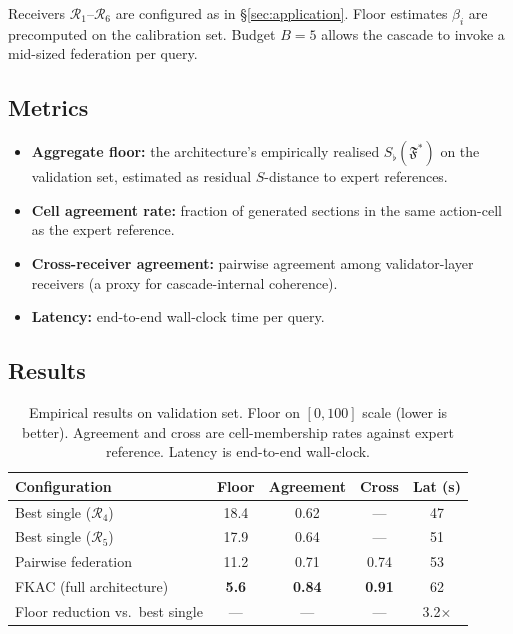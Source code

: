 \documentclass[11pt,twocolumn,a4paper]{article}
\theoremstyle{definition}
\theoremstyle{remark}
\newcommand{\Federation}{\mathfrak{F}}
\newcommand{\receiver}{\mathcal{R}}
\newcommand{\Sscalar}{S}
\newcommand{\Sfloor}{S_{\flat}}
\begin{document}
Receivers $\receiver_1$--$\receiver_6$ are configured as in \S\ref{sec:application}. Floor estimates $\beta_i$ are precomputed on the calibration set. Budget $B = 5$ allows the cascade to invoke a mid-sized federation per query.

\subsection{Metrics}

\begin{itemize}[leftmargin=*,nosep]
\item \textbf{Aggregate floor:} the architecture's empirically realised $\Sfloor(\Federation^*)$ on the validation set, estimated as residual $\Sscalar$-distance to expert references.
\item \textbf{Cell agreement rate:} fraction of generated sections in the same action-cell as the expert reference.
\item \textbf{Cross-receiver agreement:} pairwise agreement among validator-layer receivers (a proxy for cascade-internal coherence).
\item \textbf{Latency:} end-to-end wall-clock time per query.
\end{itemize}

\subsection{Results}

\begin{table}[t]
\centering\small
\begin{tabular}{lcccc}
\toprule
Configuration & Floor & Agreement & Cross & Lat (s) \\
\midrule
Best single ($\receiver_4$) & 18.4 & 0.62 & --- & 47 \\
Best single ($\receiver_5$) & 17.9 & 0.64 & --- & 51 \\
Pairwise federation & 11.2 & 0.71 & 0.74 & 53 \\
FKAC (full architecture)& \textbf{5.6} & \textbf{0.84} & \textbf{0.91} & 62 \\
\midrule
Floor reduction vs.\ best single & --- & --- & --- & 3.2$\times$ \\
\bottomrule
\end{tabular}
\caption{Empirical results on validation set. Floor on $[0, 100]$ scale (lower is better). Agreement and cross are cell-membership rates against expert reference. Latency is end-to-end wall-clock.}
\label{tab:results}
\end{table}
\end{document}
